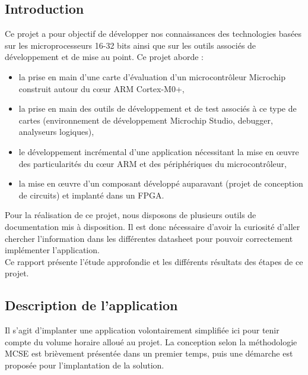 \documentclass[a4paper]{article}
\begin{document}
    \subsection{Introduction}
    Ce projet a pour objectif de développer nos connaissances des technologies basées sur les microprocesseurs 16-32 bits ainsi que sur les outils associés de développement et de mise au point. Ce projet aborde :
    \begin{itemize}
		\item la prise en main d’une carte d’évaluation d’un microcontrôleur Microchip construit autour du cœur ARM Cortex-M0+,
		\item la prise en main des outils de développement et de test associés à ce type de cartes (environnement de développement Microchip Studio, debugger, analyseurs logiques),
		\item le développement incrémental d’une application nécessitant la mise en œuvre des particularités du cœur ARM et des périphériques du microcontrôleur,
		\item la mise en œuvre d’un composant développé auparavant (projet de conception de circuits) et implanté dans un FPGA.
	\end{itemize}
    Pour la réalisation de ce projet, nous disposons de plusieurs outils de documentation mis à disposition. Il est donc nécessaire d'avoir la curiosité d'aller chercher l'information dans les différentes datasheet pour pouvoir correctement implémenter l'application.\\
    Ce rapport présente l'étude approfondie et les différents résultats des étapes de ce projet.
    \subsection{Description de l’application}
    Il s’agit d’implanter une application volontairement simplifiée ici pour tenir compte du volume horaire alloué au projet. La conception selon la méthodologie MCSE est brièvement présentée dans un premier temps, puis une démarche est proposée pour l’implantation de la solution.
\end{document}
